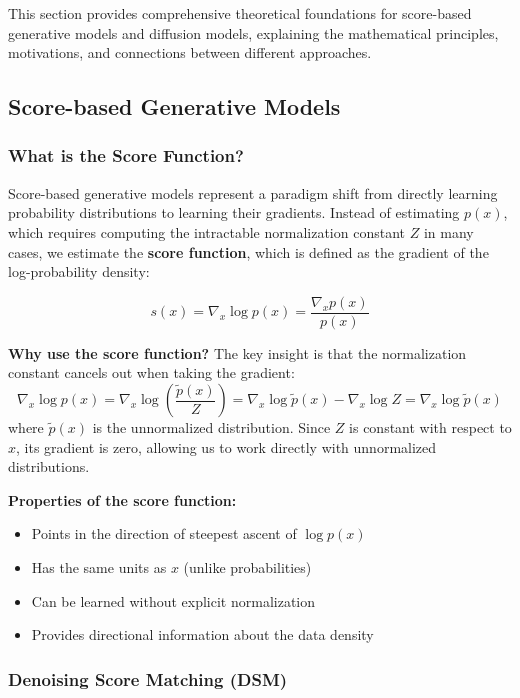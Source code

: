 \documentclass[12pt,a4paper]{article}
\begin{document}
This section provides comprehensive theoretical foundations for score-based generative models and diffusion models, explaining the mathematical principles, motivations, and connections between different approaches.

\subsection{Score-based Generative Models}

\subsubsection{What is the Score Function?}

Score-based generative models represent a paradigm shift from directly learning probability distributions to learning their gradients. Instead of estimating $p(x)$, which requires computing the intractable normalization constant $Z$ in many cases, we estimate the \textbf{score function}, which is defined as the gradient of the log-probability density:

\begin{equation}
s(x) = \nabla_x \log p(x) = \frac{\nabla_x p(x)}{p(x)}
\end{equation}

\textbf{Why use the score function?} The key insight is that the normalization constant cancels out when taking the gradient:
\begin{equation}
\nabla_x \log p(x) = \nabla_x \log \left(\frac{\tilde{p}(x)}{Z}\right) = \nabla_x \log \tilde{p}(x) - \nabla_x \log Z = \nabla_x \log \tilde{p}(x)
\end{equation}
where $\tilde{p}(x)$ is the unnormalized distribution. Since $Z$ is constant with respect to $x$, its gradient is zero, allowing us to work directly with unnormalized distributions.

\textbf{Properties of the score function:}
\begin{itemize}
    \item Points in the direction of steepest ascent of $\log p(x)$
    \item Has the same units as $x$ (unlike probabilities)
    \item Can be learned without explicit normalization
    \item Provides directional information about the data density
\end{itemize}

\subsubsection{Denoising Score Matching (DSM)}
\end{document}
